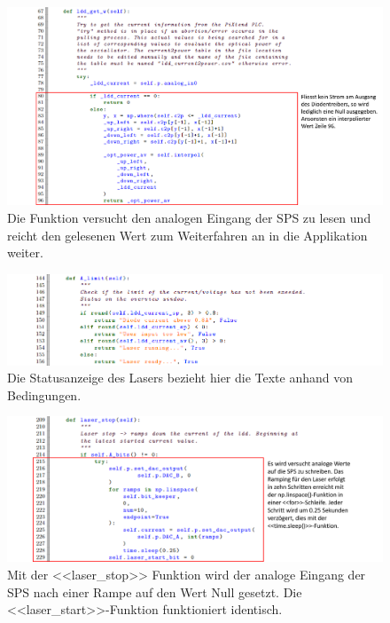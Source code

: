 \begin{appendix}
\begin{landscape}
\begin{figure}[H]
    \centering
    \includegraphics[scale=0.8]{98_images/src/fhnw_pro6m_quellcode_30.png}
    \caption*{Die Funktion versucht den analogen Eingang der SPS zu lesen und reicht den gelesenen Wert zum Weiterfahren an in die Applikation weiter.}
    \label{fig:fhnw_pro6m_quellcode_30}
\end{figure} 

\begin{figure}[H]
    \centering
    \includegraphics[scale=0.8]{98_images/src/fhnw_pro6m_quellcode_31.png}
    \caption*{Die Statusanzeige des Lasers bezieht hier die Texte anhand von Bedingungen.}
    \label{fig:fhnw_pro6m_quellcode_31}
\end{figure} 

\begin{figure}[H]
    \centering
    \includegraphics[scale=0.8]{98_images/src/fhnw_pro6m_quellcode_33.png}
    \caption*{Mit der <<laser\_stop>> Funktion wird der analoge Eingang der SPS nach einer Rampe auf den Wert Null gesetzt. Die <<laser\_start>>-Funktion funktioniert identisch.}
    \label{fig:fhnw_pro6m_quellcode_33}
\end{figure}


\end{landscape}
\end{appendix}
